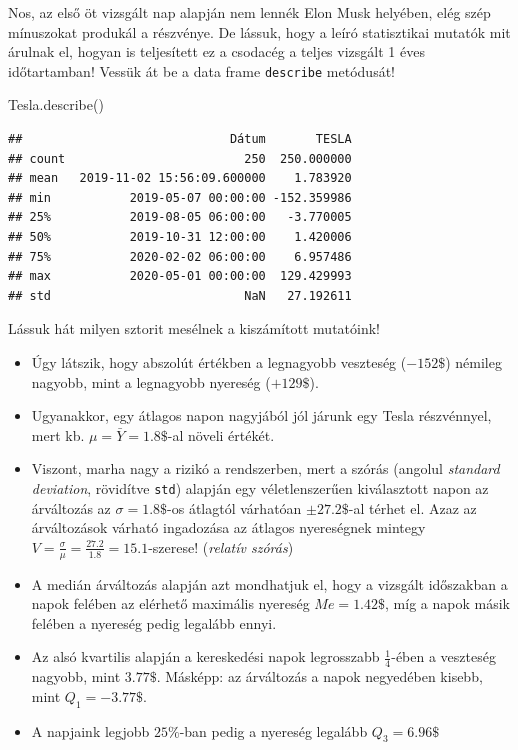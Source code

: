 \documentclass[
]{book}
\newenvironment{Shaded}{\begin{snugshade}}{\end{snugshade}}
\newcommand{\NormalTok}[1]{#1}
\providecommand{\tightlist}{%
  \setlength{\itemsep}{0pt}\setlength{\parskip}{0pt}}
\begin{document}
Nos, az első öt vizsgált nap alapján nem lennék Elon Musk helyében, elég szép mínuszokat produkál a részvénye. De lássuk, hogy a leíró statisztikai mutatók mit árulnak el, hogyan is teljesített ez a csodacég a teljes vizsgált 1 éves időtartamban! Vessük át be a data frame \texttt{describe} metódusát!

\begin{Shaded}
\begin{Highlighting}[]
\NormalTok{Tesla.describe()}
\end{Highlighting}
\end{Shaded}

\begin{verbatim}
##                             Dátum       TESLA
## count                         250  250.000000
## mean   2019-11-02 15:56:09.600000    1.783920
## min           2019-05-07 00:00:00 -152.359986
## 25%           2019-08-05 06:00:00   -3.770005
## 50%           2019-10-31 12:00:00    1.420006
## 75%           2020-02-02 06:00:00    6.957486
## max           2020-05-01 00:00:00  129.429993
## std                           NaN   27.192611
\end{verbatim}

Lássuk hát milyen sztorit mesélnek a kiszámított mutatóink!

\begin{itemize}
\tightlist
\item
  Úgy látszik, hogy abszolút értékben a legnagyobb veszteség (\(-152\$\)) némileg nagyobb, mint a legnagyobb nyereség (\(+129\$\)).
\item
  Ugyanakkor, egy átlagos napon nagyjából jól járunk egy Tesla részvénnyel, mert kb. \(\mu=\bar{Y}=1.8\$\)-al növeli értékét.
\item
  Viszont, marha nagy a rizikó a rendszerben, mert a szórás (angolul \emph{standard deviation}, rövidítve \texttt{std}) alapján egy véletlenszerűen kiválasztott napon az árváltozás az \(\sigma=1.8\$\)-os átlagtól várhatóan \(\pm27.2\$\)-al térhet el. Azaz az árváltozások várható ingadozása az átlagos nyereségnek mintegy \(V=\frac{\sigma}{\mu}=\frac{27.2}{1.8}=15.1\)-szerese! (\emph{relatív szórás})
\item
  A medián árváltozás alapján azt mondhatjuk el, hogy a vizsgált időszakban a napok felében az elérhető maximális nyereség \(Me=1.42\$\), míg a napok másik felében a nyereség pedig legalább ennyi.
\item
  Az alsó kvartilis alapján a kereskedési napok legrosszabb \(\frac{1}{4}\)-ében a veszteség nagyobb, mint \(3.77\$\). Másképp: az árváltozás a napok negyedében kisebb, mint \(Q_1=-3.77\$\).
\item
  A napjaink legjobb \(25\%\)-ban pedig a nyereség legalább \(Q_3=6.96\$\)
\end{itemize}
\end{document}
